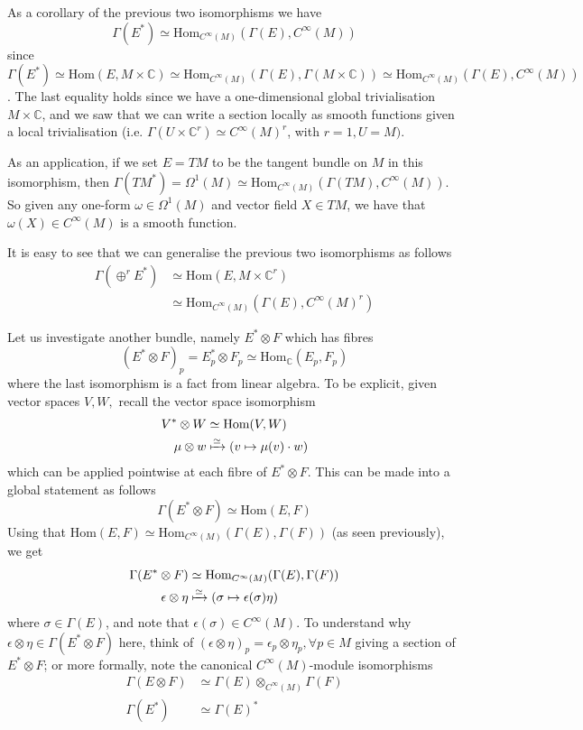 \documentclass[a4paper]{article}
\theoremstyle{definition} \newtheorem*{definition}{Definition}
\theoremstyle{definition} \newtheorem*{definitions}{Definitions}
\theoremstyle{plain} \newtheorem{theorem}{Theorem}[section]
\theoremstyle{plain} \newtheorem{proposition}[theorem]{Proposition}
\theoremstyle{plain} \newtheorem{corollary}[theorem]{Corollary}
\theoremstyle{plain} \newtheorem{lemma}[theorem]{Lemma}
\theoremstyle{plain} \newtheorem{example}[theorem]{Example}
\newcommand{\complexnos}{\mathbb{C}}
\begin{document}
As a corollary of the previous two isomorphisms we have 
$$\Gamma(E^\ast)\simeq \text{Hom}_{C^\infty (M)}(\Gamma(E), C^\infty (M))$$
since $\Gamma(E^\ast) \simeq \text{Hom}(E, M\times \complexnos) \simeq \text{Hom}_{C^\infty (M)}(\Gamma(E), \Gamma(M\times \complexnos))\simeq \text{Hom}_{C^\infty (M)}(\Gamma(E), C^\infty (M))$. The last equality holds since we have a one-dimensional global trivialisation $M\times \complexnos$, and we saw that we can write a section locally as smooth functions given a local trivialisation (i.e. $\Gamma(U\times \complexnos^r)\simeq C^\infty (M)^r$, with $r=1, U=M)$.

As an application, if we set $E=TM$ to be the tangent bundle on $M$ in this isomorphism, then $\Gamma(TM^*) = \Omega^1(M) \simeq \text{Hom}_{C^\infty (M)}(\Gamma(TM), C^\infty (M))$. So given any one-form $\omega\in \Omega^1(M)$ and vector field $X\in TM$, we have that $\omega(X)\in C^\infty(M)$ is a smooth function.

It is easy to see that we can generalise the previous two isomorphisms as follows
\begin{align*}
\Gamma(\oplus^r E^\ast) & \simeq \text{Hom}(E, M\times \complexnos^r) \\
 & \simeq \text{Hom}_{C^\infty (M)}(\Gamma(E), C^\infty (M)^r)
\end{align*} 

Let us investigate another bundle, namely $E^*\otimes F$ which has fibres 
$$(E^*\otimes F)_p=E_p^*\otimes F_p\simeq \text{Hom}_\complexnos (E_p, F_p)$$
where the last isomorphism is a fact from linear algebra. To be explicit, given vector spaces $V, W,$ recall the vector space isomorphism
\begin{align*}
V^*\otimes W & \simeq \text{Hom}(V, W) \\
\mu \otimes w & \xmapsto{\simeq} (v \mapsto \mu(v)\cdot w)
\end{align*}
which can be applied pointwise at each fibre of $E^*\otimes F$. This can be made into a global statement as follows 
$$\Gamma(E^*\otimes F)\simeq \text{Hom}(E,F)$$
Using that $\text{Hom}(E,F)\simeq \text{Hom}_{C^\infty (M)}(\Gamma(E), \Gamma(F))$ (as seen previously), we get
\begin{align*}
\Gamma(E^*\otimes F) & \simeq \text{Hom}_{C^\infty (M)}(\Gamma(E), \Gamma(F)) \\
\epsilon \otimes \eta & \xmapsto{\simeq} (\sigma \mapsto \epsilon(\sigma) \eta)
\end{align*}
where $\sigma\in \Gamma(E)$, and note that $\epsilon(\sigma)\in C^\infty (M)$. To understand why $\epsilon \otimes \eta\in \Gamma(E^*\otimes F)$ here, think of $(\epsilon \otimes \eta)_p=\epsilon_p \otimes \eta_p, \forall p\in M$ giving a section of $E^*\otimes F$; or more formally, note the canonical $C^\infty(M)$-module isomorphisms
\begin{align*}
\Gamma(E\otimes F) & \simeq \Gamma(E)\otimes_{C^\infty (M)} \Gamma(F) \\
\Gamma(E^*) & \simeq \Gamma(E)^* 
\end{align*}
\end{document}
